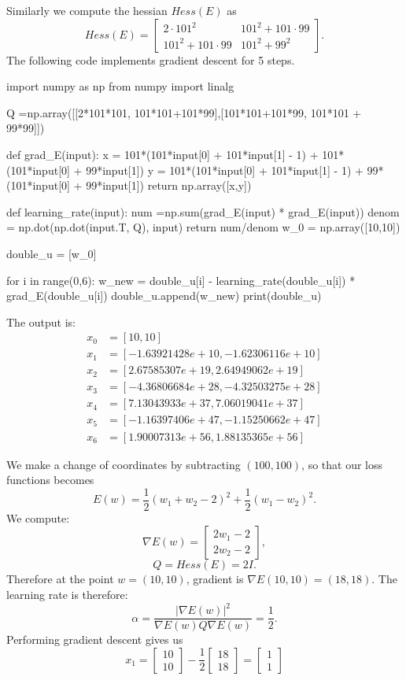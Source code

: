 \documentclass[12pt, a4paper]{article}
\theoremstyle{definition}
\newcommand{\grad}{\nabla}
\newcommand{\bmat}[1]{\begin{bmatrix}#1\end{bmatrix}}
\begin{document}
	Similarly we compute the hessian $Hess(E)$ as
	$$Hess(E) = \bmat{2\cdot 101^2 & 101^2 + 101\cdot99\\ 101^2 + 101\cdot 99 & 101^2 + 99^2}.$$
	The following code implements gradient descent for 5 steps. 
	\begin{python}
		import numpy as np
		from numpy import linalg
		
		Q =np.array([[2*101*101, 101*101+101*99],[101*101+101*99, 101*101 + 99*99]])
		
		def grad_E(input):
		x = 101*(101*input[0] + 101*input[1] - 1) + 101*(101*input[0] + 99*input[1])
		y = 101*(101*input[0] + 101*input[1] - 1) + 99*(101*input[0] + 99*input[1])
		return np.array([x,y])
		
		def learning_rate(input):
		num =np.sum(grad_E(input) * grad_E(input))
		denom = np.dot(np.dot(input.T, Q), input)
		return num/denom
		w_0 = np.array([10,10])
		
		double_u = [w_0]
		
		for i in range(0,6):
		w_new = double_u[i] - learning_rate(double_u[i]) * grad_E(double_u[i])
		double_u.append(w_new)
		print(double_u)
	\end{python}
	The output is:
	\begin{align*}
		x_0 &= [10, 10]
		\\ x_1 & = [-1.63921428e+10, -1.62306116e+10]
		\\ x_2 & = [2.67585307e+19, 2.64949062e+19]
		\\ x_3 & = [-4.36806684e+28, -4.32503275e+28]
		\\ x_4 & = [7.13043933e+37, 7.06019041e+37]
		\\ x_5 & =[-1.16397406e+47, -1.15250662e+47]
		\\ x_6 & = [1.90007313e+56, 1.88135365e+56]
	\end{align*}
	\item We make a change of coordinates by subtracting $(100,100)$, so that our loss functions becomes $$E(w) = \frac{1}{2} (w_1 + w_2 -2)^2  +\frac{1}{2} (w_1 - w_2) ^2.$$
	We compute:
	$$\grad E(w) = \bmat{  2w_1 - 2\\ 2w_2 - 2  },$$
	$$Q = Hess(E) = 2I.$$
	Therefore at the point $w = (10,10)$, gradient is $\grad E(10,10) = (18,18)$. The learning rate is therefore:
	$$\alpha = \frac{|\grad E(w)|^2}{\grad E(w) Q \grad E(w)} = \frac{1}{2}.$$
	Performing gradient descent gives us 
	$$x_1 = \bmat{10 \\ 10} - \frac{1}{2}\bmat{18 \\ 18} = \bmat{1 \\ 1}$$
\end{document}

